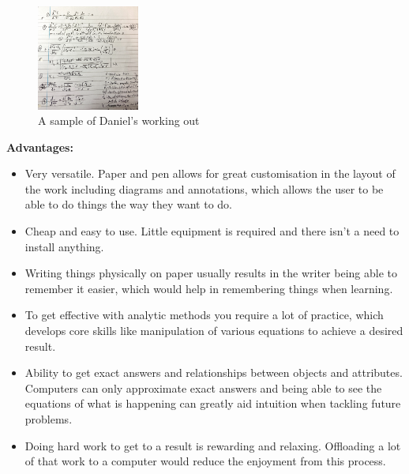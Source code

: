 \documentclass[11pt]{article}
\begin{document}
                \begin{figure}[!ht]
                    \begin{center}
                        \includegraphics[width=0.3\textwidth]{figures/daniel_working.jpeg}
                    \end{center}
                    \caption{A sample of Daniel's working out}
                    \label{fig:daniel_working}
                \end{figure}

                \newpage
                \textbf{Advantages:}
                \begin{itemize}
                    \item Very versatile. Paper and pen allows for great customisation in the layout of the work including diagrams and annotations, which allows the user to be able to do things the way they want to do.
                    \item Cheap and easy to use. Little equipment is required and there isn't a need to install anything. 
                    \item Writing things physically on paper usually results in the writer being able to remember it easier, which would help in remembering things when learning. 
                    \item To get effective with analytic methods you require a lot of practice, which develops core skills like manipulation of various equations to achieve a desired result.
                    \item Ability to get exact answers and relationships between objects and attributes. Computers can only approximate exact answers and being able to see the equations of what is happening can greatly aid intuition when tackling future problems.
                    \item Doing hard work to get to a result is rewarding and relaxing. Offloading a lot of that work to a computer would reduce the enjoyment from this process.
                \end{itemize}
\end{document}
